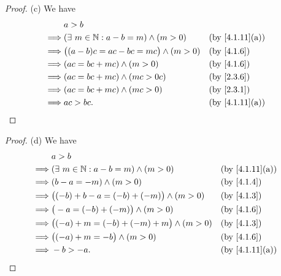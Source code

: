 \begin{proof}{(c)}
  We have
  \begin{align*}
             & a > b                                                                             \\
    \implies & (\exists\ m \in \N : a - b = m) \land (m > 0)   &  & \text{(by \cref{4.1.11}(a))} \\
    \implies & \big((a - b)c = ac - bc = mc\big) \land (m > 0) &  & \by{4.1.6}                   \\
    \implies & (ac = bc + mc) \land (m > 0)                    &  & \by{4.1.6}                   \\
    \implies & (ac = bc + mc) \land (mc > 0c)                  &  & \by{2.3.6}                   \\
    \implies & (ac = bc + mc) \land (mc > 0)                   &  & \by{2.3.1}                   \\
    \implies & ac > bc.                                        &  & \text{(by \cref{4.1.11}(a))}
  \end{align*}
\end{proof}

\begin{proof}{(d)}
  We have
  \begin{align*}
             & a > b                                                                                \\
    \implies & (\exists\ m \in \N : a - b = m) \land (m > 0)      &  & \text{(by \cref{4.1.11}(a))} \\
    \implies & (b - a = -m) \land (m > 0)                         &  & \by{4.1.4}                   \\
    \implies & \big((-b) + b - a = (-b) + (-m)\big) \land (m > 0) &  & \by{4.1.3}                   \\
    \implies & \big(-a = (-b) + (-m)\big) \land (m > 0)           &  & \by{4.1.6}                   \\
    \implies & \big((-a) + m = (-b) + (-m) + m\big) \land (m > 0) &  & \by{4.1.3}                   \\
    \implies & \big((-a) + m = -b\big) \land (m > 0)              &  & \by{4.1.6}                   \\
    \implies & -b > -a.                                           &  & \text{(by \cref{4.1.11}(a))}
  \end{align*}
\end{proof}

